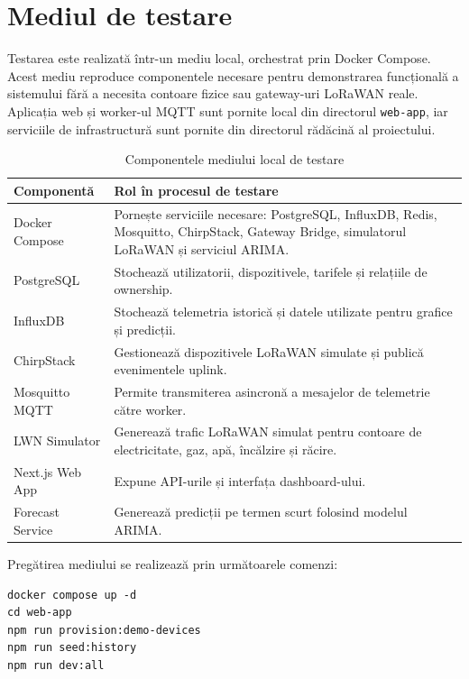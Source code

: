 \section{Mediul de testare}

Testarea este realizată într-un mediu local, orchestrat prin Docker Compose. Acest mediu reproduce componentele necesare pentru demonstrarea funcțională a sistemului fără a necesita contoare fizice sau gateway-uri LoRaWAN reale. Aplicația web și worker-ul MQTT sunt pornite local din directorul \texttt{web-app}, iar serviciile de infrastructură sunt pornite din directorul rădăcină al proiectului.

\begin{table}[htbp]
\centering
\small
\begin{tabular}{|p{}|p{}|}
\hline
\textbf{Componentă} & \textbf{Rol în procesul de testare} \\
\hline
Docker Compose & Pornește serviciile necesare: PostgreSQL, InfluxDB, Redis, Mosquitto, ChirpStack, Gateway Bridge, simulatorul LoRaWAN și serviciul ARIMA. \\
\hline
PostgreSQL & Stochează utilizatorii, dispozitivele, tarifele și relațiile de ownership. \\
\hline
InfluxDB & Stochează telemetria istorică și datele utilizate pentru grafice și predicții. \\
\hline
ChirpStack & Gestionează dispozitivele LoRaWAN simulate și publică evenimentele uplink. \\
\hline
Mosquitto MQTT & Permite transmiterea asincronă a mesajelor de telemetrie către worker. \\
\hline
LWN Simulator & Generează trafic LoRaWAN simulat pentru contoare de electricitate, gaz, apă, încălzire și răcire. \\
\hline
Next.js Web App & Expune API-urile și interfața dashboard-ului. \\
\hline
Forecast Service & Generează predicții pe termen scurt folosind modelul ARIMA. \\
\hline
\end{tabular}
\caption{Componentele mediului local de testare}
\label{tab:mediu-testare}
\end{table}

Pregătirea mediului se realizează prin următoarele comenzi:

\begin{verbatim}
docker compose up -d
cd web-app
npm run provision:demo-devices
npm run seed:history
npm run dev:all
\end{verbatim}

